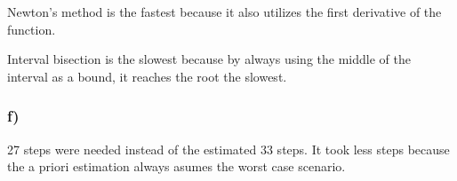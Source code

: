 Newton's method is the fastest because it also utilizes the first derivative of the function.

Interval bisection is the slowest because by always using the middle of the interval as a bound, it reaches the root the slowest.




\subsubsection{f)}

27 steps were needed instead of the estimated 33 steps. It took less steps because the a priori estimation always asumes the worst case scenario.


